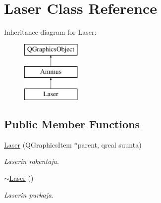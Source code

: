 \hypertarget{class_laser}{\section{Laser Class Reference}
\label{class_laser}
}
Inheritance diagram for Laser\-:\begin{figure}[H]
\begin{center}
\leavevmode
\includegraphics[height=3.000000cm]{class_laser}
\end{center}
\end{figure}
\subsection*{Public Member Functions}
\begin{DoxyCompactItemize}
\item 
\hyperlink{class_laser_a1e883d8dab1efcaf1ef692056664b080}{Laser} (Q\-Graphics\-Item $\ast$parent, qreal suunta)
\begin{DoxyCompactList}\small\item\em Laserin rakentaja. \end{DoxyCompactList}\item 
\hyperlink{class_laser_aa9baee5ed9775426e0b1d563c4687711}{$\sim$\-Laser} ()
\begin{DoxyCompactList}\small\item\em Laserin purkaja. \end{DoxyCompactList}\end{DoxyCompactItemize}
